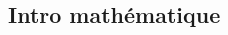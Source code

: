 \documentclass[landscape,a4paper]{article}
\begin{document}
\begin{multicols}{4}
  \section{Intro mathématique}
  \renewcommand{\arraystretch}{2} %


\end{multicols}
\end{document}
